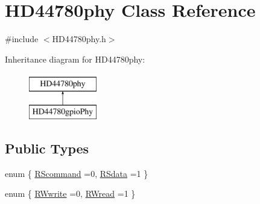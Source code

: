 \hypertarget{class_h_d44780phy}{\section{H\-D44780phy Class Reference}
\label{class_h_d44780phy}
}


{\ttfamily \#include $<$H\-D44780phy.\-h$>$}

Inheritance diagram for H\-D44780phy\-:\begin{figure}[H]
\begin{center}
\leavevmode
\includegraphics[height=2.000000cm]{class_h_d44780phy}
\end{center}
\end{figure}
\subsection*{Public Types}
\begin{DoxyCompactItemize}
\item 
enum \{ \hyperlink{class_h_d44780phy_a76851a61a3a88766704db9f31098d21fac3d8b04a4b6fa7db3d0bfc61170e1d72}{R\-Scommand} =0, 
\hyperlink{class_h_d44780phy_a76851a61a3a88766704db9f31098d21fa2108dbcf0cc7b6cdcbc6235a4e765654}{R\-Sdata} =1
 \}
\item 
enum \{ \hyperlink{class_h_d44780phy_a5bf3a330184d4cfdc6297c1265ce6746ac7b87f6864ebbc4bef3d14967ec3bc97}{R\-Wwrite} =0, 
\hyperlink{class_h_d44780phy_a5bf3a330184d4cfdc6297c1265ce6746a2777116400417dda3d881ec137a361fc}{R\-Wread} =1
 \}
\end{DoxyCompactItemize}
